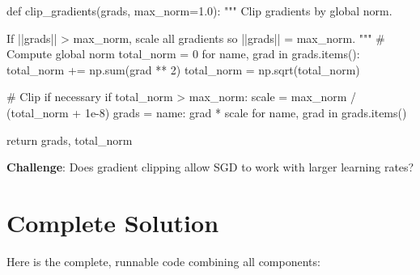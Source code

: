 \documentclass[../../main.tex]{subfiles}
\begin{document}
\begin{pythoncode}
def clip_gradients(grads, max_norm=1.0):
    """
    Clip gradients by global norm.

    If ||grads|| > max_norm, scale all gradients so ||grads|| = max_norm.
    """
    # Compute global norm
    total_norm = 0
    for name, grad in grads.items():
        total_norm += np.sum(grad ** 2)
    total_norm = np.sqrt(total_norm)

    # Clip if necessary
    if total_norm > max_norm:
        scale = max_norm / (total_norm + 1e-8)
        grads = {name: grad * scale for name, grad in grads.items()}

    return grads, total_norm
\end{pythoncode}

\textbf{Challenge}: Does gradient clipping allow SGD to work with larger learning rates?

\section{Complete Solution}
\label{sec:capstone-solution}

Here is the complete, runnable code combining all components:
\end{document}
